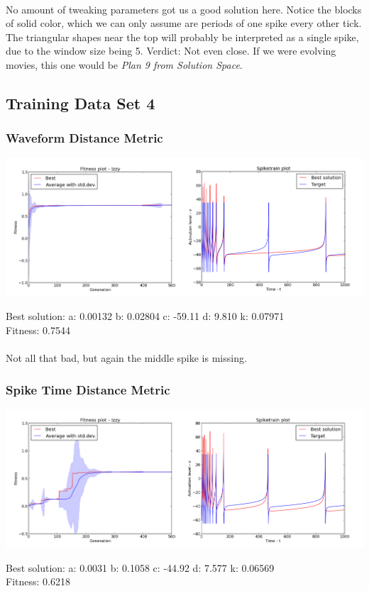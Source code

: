 \documentclass[a4paper,12pt]{article}
\begin{document}
\paragraph{}No amount of tweaking parameters got us a good solution here. Notice the blocks of solid color, which we can only assume are periods of one spike every other tick. The triangular shapes near the top will probably be interpreted as a single spike, due to the window size being 5. Verdict: Not even close. If we were evolving movies, this one would be \textit{Plan 9 from Solution Space}.

\subsection{Training Data Set 4}
\subsubsection{Waveform Distance Metric}
\centerline{\includegraphics[width=1.2\textwidth]{img/case4_wave}}
Best solution: 
a: 0.00132 
b: 0.02804 
c: -59.11 
d: 9.810 
k: 0.07971 \\
Fitness: 0.7544
\paragraph{}Not all that bad, but again the middle spike is missing.

\subsubsection{Spike Time Distance Metric}
\centerline{\includegraphics[width=1.2\textwidth]{img/case4_time}}
Best solution: 
a: 0.0031 
b: 0.1058 
c: -44.92 
d: 7.577 
k: 0.06569 \\
Fitness: 0.6218
\end{document}
